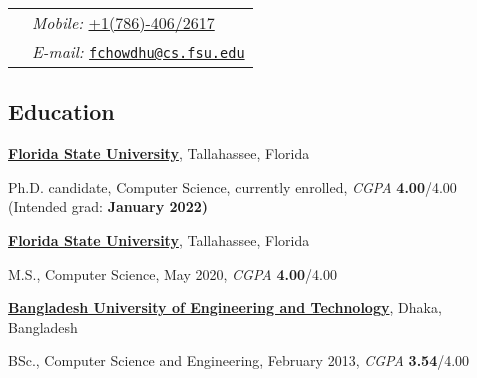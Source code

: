 \documentclass[margin,line]{res}
\newenvironment{list1}{
  \begin{list}{\ding{113}}{%
      \setlength{\itemsep}{0in}
      \setlength{\parsep}{0in} \setlength{\parskip}{0in}
      \setlength{\topsep}{0in} \setlength{\partopsep}{0in} 
      \setlength{\leftmargin}{0.17in}}}{\end{list}}
\begin{document}

\begin{tabular}{@{}p{2.5in}p{4in}}
\hspace{1cm} & \hspace{4cm} {\it Mobile:}  \href{tel:+17864062617}{+1(786)-406/2617} \\
\hspace{1cm} & \hspace{4cm} {\it E-mail:} \href{mailto:fchowdhu@cs.fsu.edu}{\nolinkurl{fchowdhu@cs.fsu.edu} } \\
\end{tabular}

\vspace*{-.2in}

\begin{resume}

\section{\sc Education}
{\bf \href{http://www.fsu.edu}{Florida State University}}, Tallahassee, Florida\\
\vspace*{-.15in}
\begin{list1}
\item[] Ph.D. candidate, Computer Science, currently enrolled, \textit{CGPA} \textbf{4.00}/4.00 (Intended grad: \bf{January 2022})
\end{list1}
\vspace*{-.15in}
{\bf \href{http://www.fsu.edu}{Florida State University}}, Tallahassee, Florida\\
\vspace*{-.15in}
\begin{list1}
\item[] M.S., Computer Science, May 2020, \textit{CGPA} \textbf{4.00}/4.00
\end{list1}
\vspace*{-.15in}
{\bf \href{http://buet.ac.bd}{Bangladesh University of Engineering and Technology}}, Dhaka, Bangladesh\\
\vspace*{-.15in}
\begin{list1}
\item[] BSc., Computer Science and Engineering, February 2013, \textit{CGPA} \textbf{3.54}/4.00
\end{list1}

\vspace*{-.05in}


\end{resume}
\end{document}
